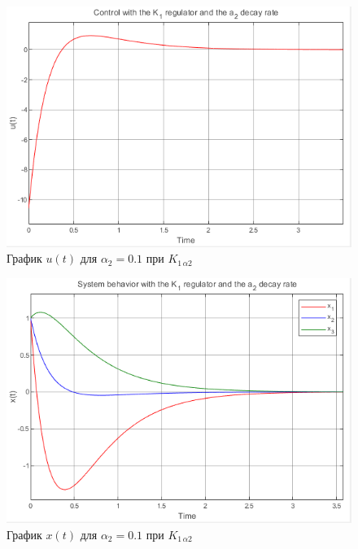 \documentclass[a4paper, 12pt]{article}
\begin{document}
    \begin{figure}[H]
        \centering
        \includegraphics{1task_K1a2_u.png}
        \captionsetup{skip=0pt}
        \caption{График $u(t)$ для $\alpha_2=0.1$ при $K_{1\,\alpha2}$}
        \label{fig:1task_K1a2_u}
    \end{figure}
    \begin{figure}[H]
        \centering
        \includegraphics{1task_K1a2_x.png}
        \captionsetup{skip=0pt}
        \caption{График $x(t)$ для $\alpha_2=0.1$ при $K_{1\,\alpha2}$}
        \label{fig:1task_K1a2_x}
    \end{figure}
    \vspace*{0.01mm}
\end{document}
